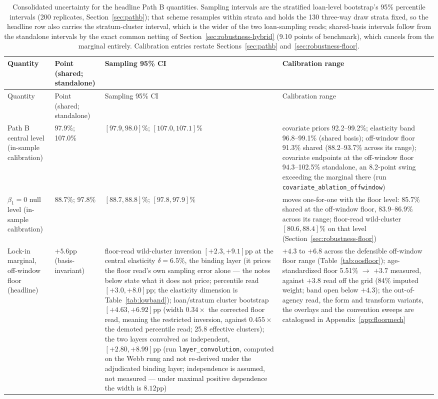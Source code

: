 \documentclass[12pt]{article}
\begin{document}
{\footnotesize
\begin{longtable}{@{}p{2.4cm}p{3.3cm}p{4.0cm}p{4.8cm}@{}}
\caption{Consolidated uncertainty for the headline Path B quantities. Sampling intervals are the stratified loan-level bootstrap's 95\% percentile intervals (200 replicates, Section~\ref{sec:pathb}); that scheme resamples within strata and holds the 130 three-way draw strata fixed, so the headline row also carries the stratum-cluster interval, which is the wider of the two loan-sampling reads; shared-basis intervals follow from the standalone intervals by the exact common netting of Section~\ref{sec:robustness-hybrid} (9.10 points of benchmark), which cancels from the marginal entirely. Calibration entries restate Sections~\ref{sec:pathb} and~\ref{sec:robustness-floor}.}
\label{tab:uncertainty}\\
\toprule
Quantity & Point (shared; standalone) & Sampling 95\% CI & Calibration range \\
\midrule
\endfirsthead
\toprule
Quantity & Point (shared; standalone) & Sampling 95\% CI & Calibration range \\
\midrule
\endhead
Path B central level (in-sample calibration) & 97.9\%; 107.0\% & $[97.9, 98.0]$\%; $[107.0, 107.1]$\% & covariate priors 92.2--99.2\%; elasticity band 96.8--99.1\% (shared basis); off-window floor 91.3\% shared (88.2--93.7\% across its range); covariate endpoints at the off-window floor 94.3--102.5\% standalone, an 8.2-point swing exceeding the marginal there (run \texttt{covariate\_ablation\_offwindow}) \\
$\beta_1 = 0$ null level (in-sample calibration) & 88.7\%; 97.8\% & $[88.7, 88.8]$\%; $[97.8, 97.9]$\% & moves one-for-one with the floor level: 85.7\% shared at the off-window floor, 83.9--86.9\% across its range; floor-read wild-cluster $[80.6, 88.4]\%$ on that level (Section~\ref{sec:robustness-floor}) \\
Lock-in marginal, off-window floor (headline) & $+5.6$pp (basis-invariant) & floor-read wild-cluster inversion $[+2.3, +9.1]$pp at the central elasticity $\delta = 6.5\%$, the binding layer (it prices the floor read's own sampling error alone --- the notes below state what it does not price; percentile read $[+3.0, +8.0]$pp; the elasticity dimension is Table~\ref{tab:lowband}); loan/stratum cluster bootstrap $[+4.63, +6.92]$pp (width $0.34\times$ the corrected floor read, meaning the restricted inversion, against $0.455\times$ the demoted percentile read; 25.8 effective clusters); the two layers convolved as independent, $[+2.80, +8.99]$pp (run \texttt{layer\_convolution}, computed on the Webb rung and not re-derived under the adjudicated binding layer; independence is assumed, not measured --- under maximal positive dependence the width is $8.12$pp) & $+4.3$ to $+6.8$ across the defensible off-window floor range (Table~\ref{tab:oosfloor}); age-standardized floor 5.51\% $\to$ $+3.7$ measured, against $+3.8$ read off the grid (84\% imputed weight; band open below $+4.3$); the out-of-agency read, the form and transform variants, the overlays and the convention sweeps are catalogued in Appendix~\ref{app:floormech} \\

\end{longtable}}
\end{document}
